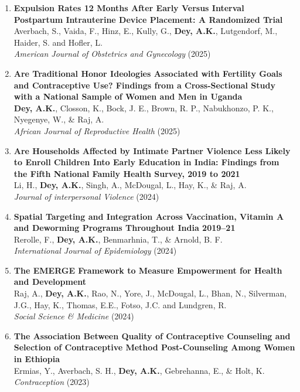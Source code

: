 \documentclass[13pt,letterpaper]{article}
\begin{document}
\begin{enumerate}
\item \textbf{Expulsion Rates 12 Months After Early Versus Interval Postpartum Intrauterine Device Placement: A Randomized Trial}
Averbach, S., Vaida, F., Hinz, E., Kully, G., \textbf{Dey, A.K.}, Lutgendorf, M., Haider, S. and Hofler, L. \\
\emph{American Journal of Obstetrics and Gynecology} (2025) 

\item \textbf{Are Traditional Honor Ideologies Associated with Fertility Goals and Contraceptive Use? Findings from a Cross-Sectional Study with a National Sample of Women and Men in Uganda}\\
\textbf{Dey, A.K.}, Closson, K., Bock, J. E., Brown, R. P., Nabukhonzo, P. K., Nyegenye, W., \& Raj, A.\\
\emph{African Journal of Reproductive Health} (2025) 

\item \textbf{Are Households Affected by Intimate Partner Violence Less Likely to Enroll Children Into Early Education in India: Findings from the Fifth National Family Health Survey, 2019 to 2021}\\
Li, H., \textbf{Dey, A.K.}, Singh, A., McDougal, L., Hay, K., \& Raj, A.\\
\emph{Journal of interpersonal Violence} (2024) 

\item \textbf{Spatial Targeting and Integration Across Vaccination, Vitamin A and Deworming Programs Throughout India 2019–21}\\
Rerolle, F., \textbf{Dey, A.K.}, Benmarhnia, T., \& Arnold, B. F.\\
\emph{International Journal of Epidemiology} (2024) 

\item \textbf{The EMERGE Framework to Measure Empowerment for Health and Development}\\
Raj, A., \textbf{Dey, A.K.}, Rao, N., Yore, J., McDougal, L., Bhan, N., Silverman, J.G., Hay, K., Thomas, E.E., Fotso, J.C. and Lundgren, R.\\
\emph{Social Science \& Medicine} (2024) 

\item \textbf{The Association Between Quality of Contraceptive Counseling and Selection of Contraceptive Method Post-Counseling Among Women in Ethiopia}\\
Ermias, Y., Averbach, S. H., \textbf{Dey, A.K.}, Gebrehanna, E., \& Holt, K.\\
\emph{Contraception} (2023) 


\end{enumerate}
\end{document}
